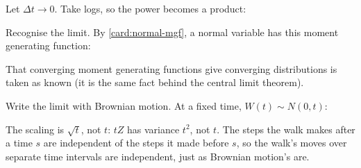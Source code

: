 \begin{steps}[resume]
\item\label{w:lim} Let $\Delta t\to0$. Take logs, so the power becomes a product:
\begin{deriv}
\end{deriv}

\item\label{w:normal} Recognise the limit. By \cref{card:normal-mgf}, a normal variable has this moment generating function:
\begin{deriv}
\end{deriv}
That converging moment generating functions give converging distributions is taken as known (it is the same fact behind the central limit theorem).

\item\label{w:bm} Write the limit with Brownian motion. At a fixed time, $W(t)\sim N(0,t)$:
\begin{deriv}
\end{deriv}
The scaling is $\sqrt t$, not $t$: $tZ$ has variance $t^2$, not $t$.
The steps the walk makes after a time $s$ are independent of the steps it made before $s$, so the walk's moves over separate time intervals are independent, just as Brownian motion's are.
\end{steps}

